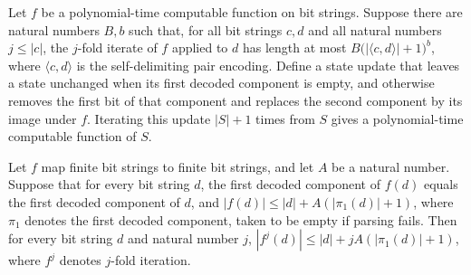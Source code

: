\begin{theorem}
\label{Complexity.BinArith.polyTimeComputable_forLoop}
\leanok
{}
Let $f$ be a polynomial-time computable function on bit strings. Suppose there are
natural numbers $B,b$ such that, for all bit strings $c,d$ and all natural numbers
$j\leq |c|$, the $j$-fold iterate of $f$ applied to $d$ has length at most
$B\bigl(|\langle c,d\rangle|+1\bigr)^b$, where $\langle c,d\rangle$ is the
self-delimiting pair encoding. Define a state update that leaves a state unchanged when
its first decoded component is empty, and otherwise removes the first bit of that
component and replaces the second component by its image under $f$. Iterating this
update $|S|+1$ times from $S$ gives a polynomial-time computable function of $S$.
\end{theorem}

\begin{theorem}
\label{Complexity.BinArith.length_iterate_le_of_ctx}
\leanok
{}
Let $f$ map finite bit strings to finite bit strings, and let $A$ be a natural number.
Suppose that for every bit string $d$, the first decoded component of $f(d)$ equals the
first decoded component of $d$, and $|f(d)|≤|d|+A(|\pi_1(d)|+1)$, where $\pi_1$ denotes
the first decoded component, taken to be empty if parsing fails. Then for every bit
string $d$ and natural number $j$, $|f^{j}(d)|≤|d|+jA(|\pi_1(d)|+1)$, where $f^j$
denotes $j$-fold iteration.
\end{theorem}


